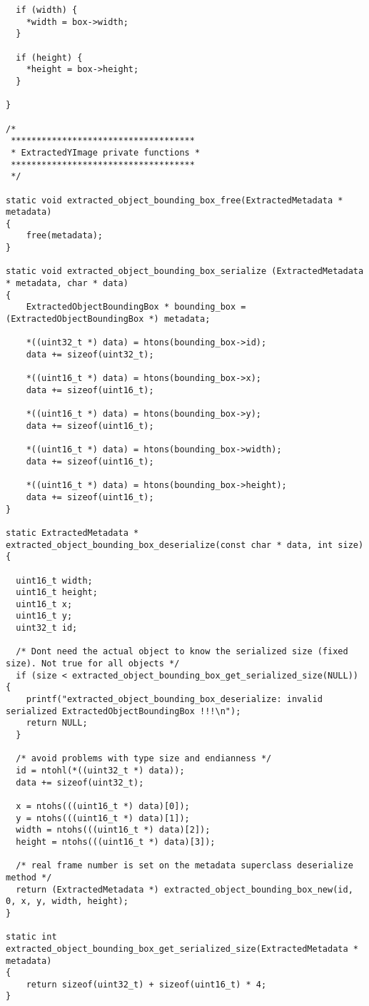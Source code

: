 \begin{lstlisting}
  if (width) {
    *width = box->width;
  }

  if (height) {
    *height = box->height;
  }

}

/*
 ************************************
 * ExtractedYImage private functions *
 ************************************
 */

static void extracted_object_bounding_box_free(ExtractedMetadata * metadata)
{
    free(metadata);
}

static void extracted_object_bounding_box_serialize (ExtractedMetadata * metadata, char * data)
{
    ExtractedObjectBoundingBox * bounding_box = (ExtractedObjectBoundingBox *) metadata;
   
    *((uint32_t *) data) = htons(bounding_box->id);
    data += sizeof(uint32_t);

    *((uint16_t *) data) = htons(bounding_box->x);
    data += sizeof(uint16_t);

    *((uint16_t *) data) = htons(bounding_box->y);
    data += sizeof(uint16_t);

    *((uint16_t *) data) = htons(bounding_box->width);
    data += sizeof(uint16_t);

    *((uint16_t *) data) = htons(bounding_box->height);
    data += sizeof(uint16_t);
}

static ExtractedMetadata * extracted_object_bounding_box_deserialize(const char * data, int size)
{
  
  uint16_t width;
  uint16_t height;
  uint16_t x;
  uint16_t y;
  uint32_t id;

  /* Dont need the actual object to know the serialized size (fixed size). Not true for all objects */
  if (size < extracted_object_bounding_box_get_serialized_size(NULL)) {
    printf("extracted_object_bounding_box_deserialize: invalid serialized ExtractedObjectBoundingBox !!!\n");
    return NULL;
  }

  /* avoid problems with type size and endianness */
  id = ntohl(*((uint32_t *) data));
  data += sizeof(uint32_t);

  x = ntohs(((uint16_t *) data)[0]);
  y = ntohs(((uint16_t *) data)[1]);
  width = ntohs(((uint16_t *) data)[2]);
  height = ntohs(((uint16_t *) data)[3]);

  /* real frame number is set on the metadata superclass deserialize method */
  return (ExtractedMetadata *) extracted_object_bounding_box_new(id, 0, x, y, width, height);
}

static int extracted_object_bounding_box_get_serialized_size(ExtractedMetadata * metadata)
{
    return sizeof(uint32_t) + sizeof(uint16_t) * 4;
}


\end{lstlisting}
